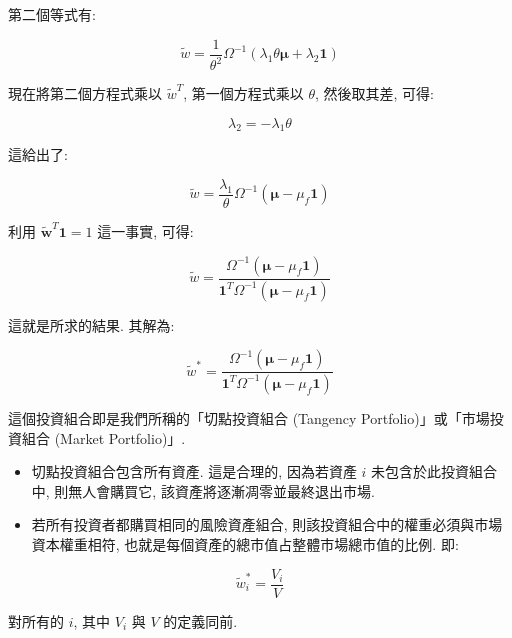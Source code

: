 \documentclass[letterpaper]{article}
\begin{document}
		第二個等式有: 
		
		$$
		\tilde{w}=\frac{1}{\theta^{2}} \Omega^{-1}\left (\lambda_{1} \theta \boldsymbol{\mu}+\lambda_{2} \mathbf{1}\right) 
		$$
		
		現在將第二個方程式乘以 $\tilde{w}^{T}$, 第一個方程式乘以 $\theta$, 然後取其差, 可得: 
		
		
		$$
		\lambda_{2}=-\lambda_{1} \theta
		$$
		
		這給出了: 
		
		$$
		\tilde{w}=\frac{\lambda_{1}}{\theta} \Omega^{-1}\left (\boldsymbol{\mu}-\mu_{f} \mathbf{1}\right) 
		$$
		
		利用 $\tilde{\mathbf{w}}^{T} \mathbf{1}=1$ 這一事實, 可得: 
		
		
		$$
		\tilde{w}=\frac{\Omega^{-1}\left (\boldsymbol{\mu}-\mu_{f} \mathbf{1}\right) }{\mathbf{1}^{T} \Omega^{-1}\left (\boldsymbol{\mu}-\mu_{f} \mathbf{1}\right) }
		$$
		
		這就是所求的結果. 其解為: 
		
		
		$$
		\tilde{w}^{*}=\frac{\Omega^{-1}\left (\boldsymbol{\mu}-\mu_{f} \mathbf{1}\right) }{\mathbf{1}^{T} \Omega^{-1}\left (\boldsymbol{\mu}-\mu_{f} \mathbf{1}\right) }
		$$
		
		這個投資組合即是我們所稱的「切點投資組合 (Tangency Portfolio)」或「市場投資組合 (Market Portfolio)」. 
		
		\begin{itemize}
			\item 切點投資組合包含所有資產. 這是合理的, 因為若資產 $i$ 未包含於此投資組合中, 則無人會購買它, 該資產將逐漸凋零並最終退出市場. 
			\item 若所有投資者都購買相同的風險資產組合, 則該投資組合中的權重必須與市場資本權重相符, 也就是每個資產的總市值占整體市場總市值的比例. 即: 
		\end{itemize}
		
		
		$$
		\tilde{w}_{i}^{*}=\frac{V_{i}}{V}
		$$
		
		對所有的 $i$, 其中 $V_{i}$ 與 $V$ 的定義同前. 
		
		
		
	
\end{document}
